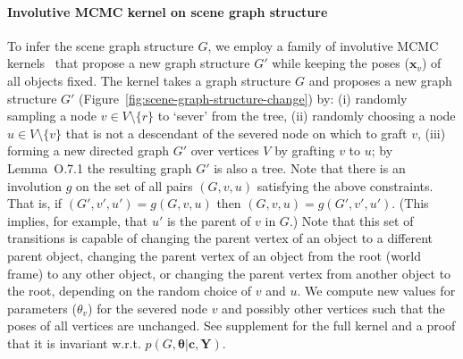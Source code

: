 \paragraph{Involutive MCMC kernel on scene graph structure}
To infer the scene graph structure $G$, we employ a family of involutive MCMC kernels~\citep{cusumano2020automating} that
propose a new graph structure $G'$ while keeping the poses ($\mathbf{x}_v$) of all objects fixed.
The kernel takes a graph structure $G$ and proposes a new graph structure $G'$ (Figure~\ref{fig:scene-graph-structure-change}) by:
(i) randomly sampling a node $v \in V \setminus \{r\}$ to `sever' from the tree,
(ii) randomly choosing a node $u \in V \setminus \{v\}$ that is not a descendant of the severed node on which to graft $v$,
(iii) forming a new directed graph $G'$ over vertices $V$ by grafting $v$ to $u$; by Lemma~O.7.1 the resulting graph $G'$ is also a tree.
Note that there is an involution $g$ on the set of all pairs $(G, v, u)$ satisfying the above constraints.
That is, if
$(G', v', u') = g(G, v, u)$
then
$(G, v, u) = g(G', v', u')$.
(This implies, for example, that $u'$ is the parent of $v$ in $G$.)
Note that this set of transitions is capable of changing the parent vertex of an object to a different parent object,
changing the parent vertex of an object from the root (world frame) to any other object,
or changing the parent vertex from another object to the root, depending on the random choice of $v$ and $u$.
We compute new values for parameters ($\theta_v$) for the severed node $v$ and possibly other vertices such that the poses of all vertices are unchanged.
See supplement for the full kernel and a proof that it is invariant w.r.t. $p(G, \bm\theta | \mathbf{c}, \mathbf{Y})$.

